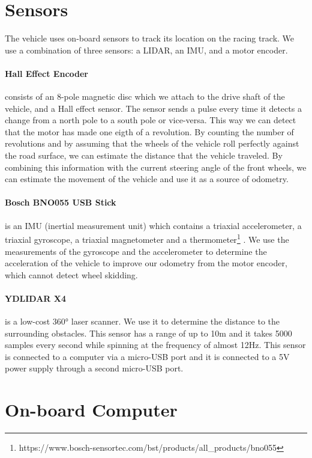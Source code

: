 \section{Sensors}

The vehicle uses on-board sensors to track its location on the racing track. We use a combination of three sensors: a LIDAR, an IMU, and a motor encoder.

\paragraph{Hall Effect Encoder} consists of an 8-pole magnetic disc which we attach to the drive shaft of the vehicle, and a Hall effect sensor. The sensor sends a pulse every time it detects a change from a north pole to a south pole or vice-versa. This way we can detect that the motor has made one eigth of a revolution. By counting the number of revolutions and by assuming that the wheels of the vehicle roll perfectly against the road surface, we can estimate the distance that the vehicle traveled. By combining this information with the current steering angle of the front wheels, we can estimate the movement of the vehicle and use it as a source of odometry.

\paragraph{Bosch BNO055 USB Stick} is an IMU (inertial measurement unit) which contains a triaxial accelerometer, a triaxial gyroscope, a triaxial magnetometer and a thermometer\footnote{https://www.bosch-sensortec.com/bst/products/all\_products/bno055} . We use the measurements of the gyroscope and the accelerometer to determine the acceleration of the vehicle to improve our odometry from the motor encoder, which cannot detect wheel skidding.

\paragraph{YDLIDAR X4} is a low-cost \ang{360} laser scanner. We use it to determine the distance to the surrounding obstacles. This sensor has a range of up to \si{10}{m} and it takes \num{5000} samples every second while spinning at the frequency of almost \si{12}{Hz}. This sensor is connected to a computer via a micro-USB port and it is connected to a \si{5}{V} power supply through a second micro-USB port.

\section{On-board Computer}

